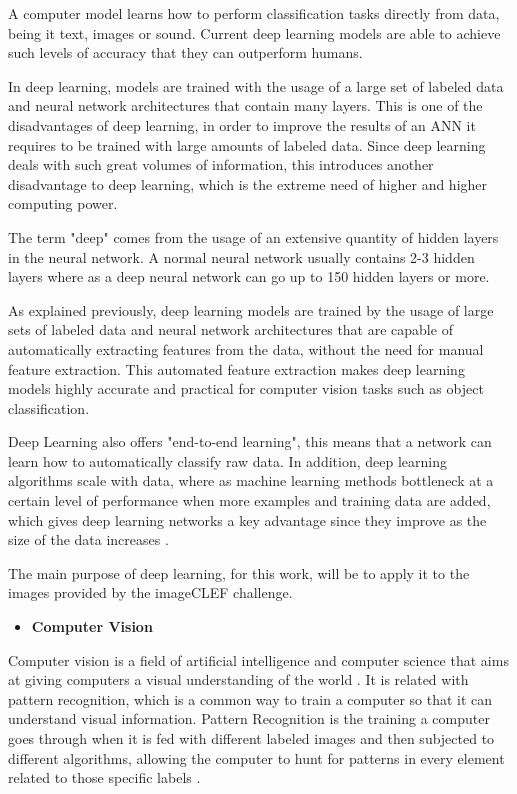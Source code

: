     \par A computer model learns how to perform classification tasks directly from data, being it text, images or sound. Current deep learning models are able to achieve such levels of accuracy that they can outperform humans.

    \par In deep learning, models are trained with the usage of a large set of labeled data and neural network architectures that contain many layers. This is one of the disadvantages of deep learning, in order to improve the results of an ANN it requires to be trained with large amounts of labeled data. Since deep learning deals with such great volumes of information, this introduces another disadvantage to deep learning, which is the extreme need of higher and higher computing power.

   
        
    \par The term "deep" comes from the usage of an extensive quantity of hidden layers in the neural network. A normal neural network usually contains 2-3 hidden layers where as a deep neural network can go up to 150 hidden layers or more.

    \par As explained previously, deep learning models are trained by the usage of  large sets of labeled data and neural network architectures that are capable of automatically extracting features from the data, without the need for manual feature extraction. This automated feature extraction makes deep learning models highly accurate and practical for computer vision tasks such as object classification. 
    
    \par Deep Learning also offers "end-to-end learning", this means that a network can learn how to automatically classify raw data. In addition, deep learning algorithms scale with data, where as machine learning methods bottleneck at a certain level of performance when more examples and training data are added, which gives deep learning networks a key advantage since they improve as the size of the data increases \cite{mathworks_deeplearning}.


    The main purpose of deep learning, for this work, will be to apply it to the images provided by the imageCLEF challenge.
    
    \begin{itemize}
        \item \textbf{Computer Vision}
    \end{itemize}
    \par Computer vision is a field of artificial intelligence and computer science that aims at giving computers a visual understanding of the world \cite{cv} \cite{cv2}. It is related with pattern recognition, which is a common way to train a computer so that it can understand visual information. Pattern Recognition is the training a computer goes through when it is fed with different labeled images and then subjected to different algorithms, allowing the computer to hunt for patterns in every element related to those specific labels \cite{pattern}.


